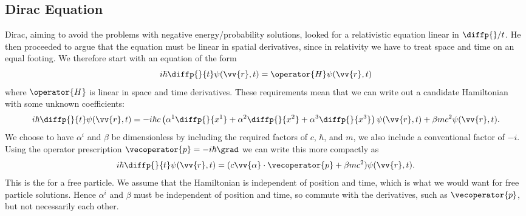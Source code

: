 \subsection{Dirac Equation}
Dirac, aiming to avoid the problems with negative energy/probability solutions, looked for a relativistic equation linear in \(\diffp{}/{t}\).
He then proceeded to argue that the equation must be linear in spatial derivatives, since in relativity we have to treat space and time on an equal footing.
We therefore start with an equation of the form
\begin{equation}
    i\hbar\diffp{}{t}\psi(\vv{r}, t) = \operator{H}\psi(\vv{r}, t)
\end{equation}
where \(\operator{H}\) is linear in space and time derivatives.
These requirements mean that we can write out a candidate Hamiltonian with some unknown coefficients:
\begin{equation}
    i\hbar\diffp{}{t}\psi(\vv{r}, t) = -i\hbar c\left( \alpha^1\diffp{}{x^1} + \alpha^2\diffp{}{x^2} + \alpha^3\diffp{}{x^3} \right) \psi(\vv{r}, t) + \beta mc^2 \psi(\vv{r}, t).
\end{equation}
We choose to have \(\alpha^i\) and \(\beta\) be dimensionless by including the required factors of \(c\), \(\hbar\), and \(m\), we also include a conventional factor of \(-i\).
Using the operator prescription \(\vecoperator{p} = -i\hbar\grad\) we can write this more compactly as
\begin{equation}
    i\hbar\diffp{}{t}\psi(\vv{r}, t) = (c\vv{\alpha} \cdot \vecoperator{p} + \beta mc^2) \psi(\vv{r}, t).
\end{equation}
This is the  for a free particle.
We assume that the Hamiltonian is independent of position and time, which is what we would want for free particle solutions.
Hence \(\alpha^i\) and \(\beta\) must be independent of position and time, so commute with the derivatives, such as \(\vecoperator{p}\), but not necessarily each other.

